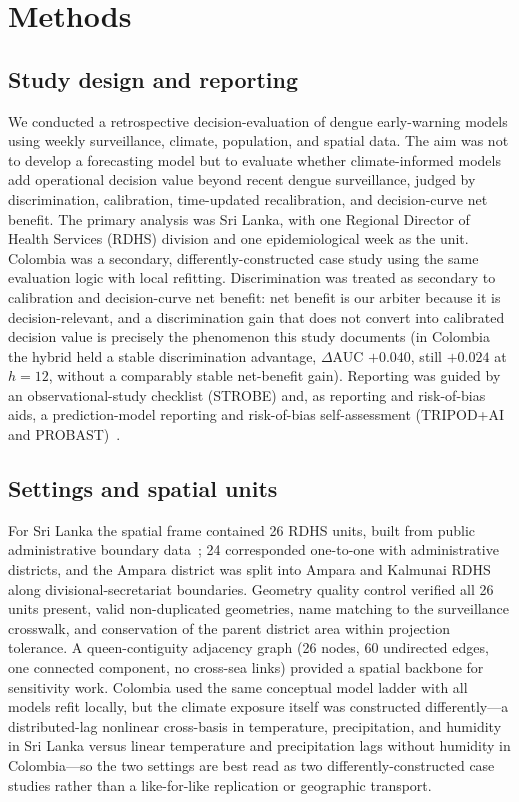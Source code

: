 \documentclass[11pt,a4paper]{article}
\begin{document}
\section{Methods}

\subsection{Study design and reporting}
We conducted a retrospective decision-evaluation of dengue early-warning models using weekly surveillance, climate, population, and spatial data. The aim was not to develop a forecasting model but to evaluate whether climate-informed models add operational decision value beyond recent dengue surveillance, judged by discrimination, calibration, time-updated recalibration, and decision-curve net benefit. The primary analysis was Sri Lanka, with one Regional Director of Health Services (RDHS) division and one epidemiological week as the unit. Colombia was a secondary, differently-constructed case study using the same evaluation logic with local refitting. Discrimination was treated as secondary to calibration and decision-curve net benefit: net benefit is our arbiter because it is decision-relevant, and a discrimination gain that does not convert into calibrated decision value is precisely the phenomenon this study documents (in Colombia the hybrid held a stable discrimination advantage, $\Delta$AUC $+0.040$, still $+0.024$ at $h=12$, without a comparably stable net-benefit gain). Reporting was guided by an observational-study checklist (STROBE) and, as reporting and risk-of-bias aids, a prediction-model reporting and risk-of-bias self-assessment (TRIPOD+AI and PROBAST)~\cite{vonElm2007,Collins2024TRIPODAI,Wolff2019,Moons2019}.

\subsection{Settings and spatial units}
For Sri Lanka the spatial frame contained 26 RDHS units, built from public administrative boundary data~\cite{HDXCODABSriLanka}; 24 corresponded one-to-one with administrative districts, and the Ampara district was split into Ampara and Kalmunai RDHS along divisional-secretariat boundaries. Geometry quality control verified all 26 units present, valid non-duplicated geometries, name matching to the surveillance crosswalk, and conservation of the parent district area within projection tolerance. A queen-contiguity adjacency graph (26 nodes, 60 undirected edges, one connected component, no cross-sea links) provided a spatial backbone for sensitivity work. Colombia used the same conceptual model ladder with all models refit locally, but the climate exposure itself was constructed differently---a distributed-lag nonlinear cross-basis in temperature, precipitation, and humidity in Sri Lanka versus linear temperature and precipitation lags without humidity in Colombia---so the two settings are best read as two differently-constructed case studies rather than a like-for-like replication or geographic transport.
\end{document}
